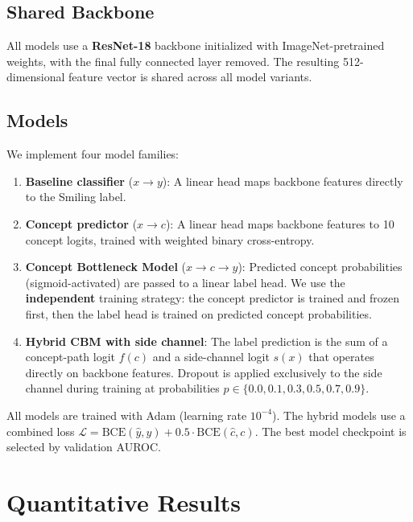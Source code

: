 \documentclass[11pt,a4paper]{article}
\begin{document}
\subsection{Shared Backbone}

All models use a \textbf{ResNet-18} backbone initialized with ImageNet-pretrained weights, with the final fully connected layer removed. The resulting 512-dimensional feature vector is shared across all model variants.

\subsection{Models}

We implement four model families:

\begin{enumerate}[leftmargin=*]
  \item \textbf{Baseline classifier} ($x \to y$): A linear head maps backbone features directly to the Smiling label.
  \item \textbf{Concept predictor} ($x \to c$): A linear head maps backbone features to 10 concept logits, trained with weighted binary cross-entropy.
  \item \textbf{Concept Bottleneck Model} ($x \to c \to y$): Predicted concept probabilities (sigmoid-activated) are passed to a linear label head. We use the \textbf{independent} training strategy: the concept predictor is trained and frozen first, then the label head is trained on predicted concept probabilities.
  \item \textbf{Hybrid CBM with side channel}: The label prediction is the sum of a concept-path logit $f(c)$ and a side-channel logit $s(x)$ that operates directly on backbone features. Dropout is applied exclusively to the side channel during training at probabilities $p \in \{0.0, 0.1, 0.3, 0.5, 0.7, 0.9\}$.
\end{enumerate}

All models are trained with Adam (learning rate $10^{-4}$). The hybrid models use a combined loss $\mathcal{L} = \text{BCE}(\hat{y}, y) + 0.5 \cdot \text{BCE}(\hat{c}, c)$. The best model checkpoint is selected by validation AUROC.


\section{Quantitative Results}
\end{document}
